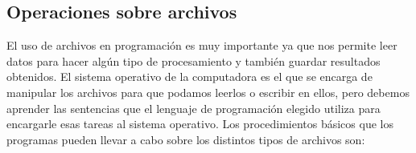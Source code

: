 \documentclass[
]{book}
\begin{document}
\hypertarget{operaciones-sobre-archivos}{%
\subsection{Operaciones sobre archivos}\label{operaciones-sobre-archivos}}

El uso de archivos en programación es muy importante ya que nos permite leer datos para hacer algún tipo de procesamiento y también guardar resultados obtenidos. El sistema operativo de la computadora es el que se encarga de manipular los archivos para que podamos leerlos o escribir en ellos, pero debemos aprender las sentencias que el lenguaje de programación elegido utiliza para encargarle esas tareas al sistema operativo. Los procedimientos básicos que los programas pueden llevar a cabo sobre los distintos tipos de archivos son:
\end{document}
